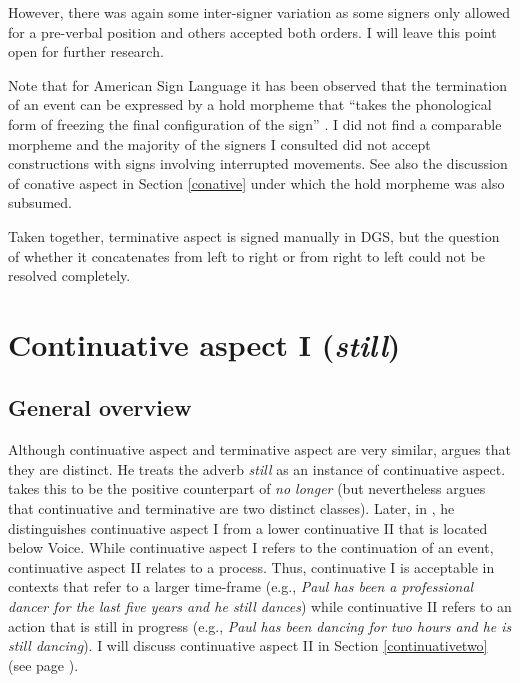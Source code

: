 \noindent However, there was again some inter-signer variation as some signers only allowed for a pre-verbal position and others accepted both orders. I will leave this point open for further research. 

Note that for American Sign Language it has been observed that the termination of an event can be expressed by a hold morpheme \citep{brentari1998prosodic, wilbur2000when, rathmann2005event} that ``takes the phonological form of freezing the final configuration of the sign'' \citep[43]{rathmann2005event}. I did not find a comparable morpheme and the majority of the signers I consulted did not accept constructions with signs involving interrupted movements. See also the discussion of conative aspect in Section \ref{conative} under which the hold morpheme was also subsumed.

Taken together, terminative aspect is signed manually in DGS, but the question of whether it concatenates from left to right or from right to left could not be resolved completely. 



\section{Continuative aspect I (\textit{still})}\label{continuativeone}
\subsection{General overview}
Although continuative aspect and terminative aspect are very similar, \citet[95]{cinque1999adverbs} argues that they are distinct. He treats the adverb \textit{still} as an instance of continuative aspect. \citet{cinque1999adverbs} takes this to be the positive counterpart of \textit{no longer} (but nevertheless argues that continuative and terminative are two distinct classes). Later, in \citet{cinque2006restructuring}, he distinguishes continuative aspect I from a lower continuative II  that is located below Voice. While continuative aspect I refers to the continuation of an event, continuative aspect II relates to a process. Thus, continuative I is acceptable in contexts that refer to a larger time-frame (e.g., \textit{Paul has been a professional dancer for the last five years and he still dances}) while continuative II refers to an action that is still in progress (e.g., \textit{Paul has been dancing for two hours and he is still dancing}). I will discuss continuative aspect II in Section \ref{continuativetwo} (see page \pageref{continuativetwo}).

